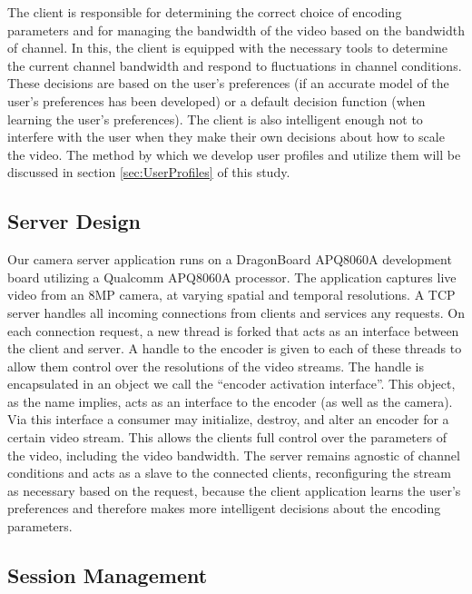 \documentclass[3p,times,procedia]{elsarticle}
\begin{document}
The client is responsible for determining the correct choice of encoding parameters and for managing the bandwidth of the video based on the bandwidth of channel. In this, the client is equipped with the necessary tools to determine the current channel bandwidth and respond to fluctuations in channel conditions. These decisions are based on the user's preferences (if an accurate model of the user’s preferences has been developed) or a default decision function (when learning the user’s preferences). The client is also intelligent enough not to interfere with the user when they make their own decisions about how to scale the video. The method by which we develop user profiles and utilize them will be discussed in section \ref{sec:UserProfiles} of this study.

\subsection{Server Design}

Our camera server application runs on a DragonBoard APQ8060A development board utilizing a Qualcomm APQ8060A processor. The application captures live video from an 8MP camera, at varying spatial and temporal resolutions. A TCP server handles all incoming connections from clients and services any requests. On each connection request, a new thread is forked that acts as an interface between the client and server. A handle to the encoder is given to each of these threads to allow them control over the resolutions of the video streams. The handle is encapsulated in an object we call the ``encoder activation interface''. This object, as the name implies, acts as an interface to the encoder (as well as the camera). Via this interface a consumer may initialize, destroy, and alter an encoder for a certain video stream. This allows the clients full control over the parameters of the video, including the video bandwidth. The server remains agnostic of channel conditions and acts as a slave to the connected clients, reconfiguring the stream as necessary based on the request, because the client application learns the user’s preferences and therefore makes more intelligent decisions about the encoding parameters.

\subsection{Session Management}
\end{document}
